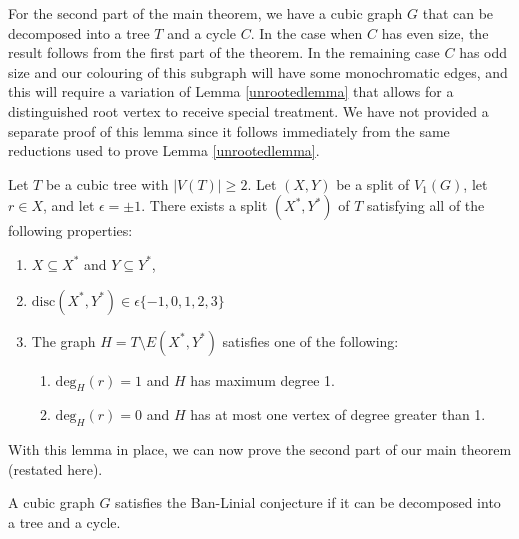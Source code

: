 \documentclass[12pt]{article}
\begin{document}
For the second part of the main theorem, we have a cubic graph $G$ that can be decomposed into a tree $T$ and a cycle $C$.  In the case when $C$ has even size, the result follows from the first part of the theorem.  In the remaining case $C$ has odd size and our colouring of this subgraph will have some monochromatic edges, and this will require a variation of Lemma \ref{unrootedlemma} that allows for a distinguished root vertex to receive special treatment.  We have not provided a separate proof of this lemma since it follows immediately from the same reductions used to prove Lemma \ref{unrootedlemma}.


\begin{lemma}
\label{rootedlemma}
Let $T$ be a cubic tree with $|V(T)| \ge 2$.  Let $(X,Y)$ be a split of $V_1(G)$, let $r \in X$, and let $\epsilon = \pm 1$.  There exists a split $(X^*,Y^*)$ of $T$ satisfying all of the following properties:
\begin{enumerate}
\item $X \subseteq X^*$ and $Y \subseteq Y^*$,
\item $\mathrm{disc}(X^*,Y^*) \in \epsilon \{-1,0,1,2,3\}$
\item The graph $H = T \setminus E(X^*,Y^*)$ satisfies one of the following:
\begin{enumerate}
\item  $\mathrm{deg}_H(r) = 1$ and $H$ has maximum degree 1.
\item $\mathrm{deg}_H(r) = 0$ and $H$ has at most one vertex of degree greater than 1.
\end{enumerate}
\end{enumerate}
\end{lemma}

With this lemma in place, we can now prove the second part of our main theorem (restated here).

\begin{theorem}
A cubic graph $G$ satisfies the Ban-Linial conjecture if it can be decomposed into a tree and a cycle.
\end{theorem}
\end{document}

